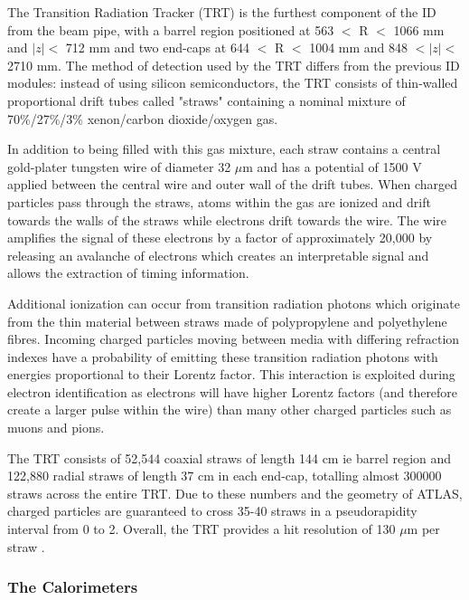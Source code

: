 \documentclass[12pt,a4paper,epsf,portrait,times,epsfig]{article}
\begin{document}
		The Transition Radiation Tracker (TRT) \cite{ATLASTRT} is the furthest component of the ID from the beam pipe, with a barrel region positioned at 563 $<$ R $<$ 1066 mm and $|z| <$ 712 mm and two end-caps at 644 $<$ R $<$ 1004 mm and 848 $< |z| <$ 2710 mm. The method of detection used by the TRT differs from the previous ID modules: instead of using silicon semiconductors, the TRT consists of thin-walled proportional drift tubes called "straws" containing a nominal mixture of 70\%/27\%/3\% xenon/carbon dioxide/oxygen gas. \par 
		In addition to being filled with this gas mixture, each straw contains a central gold-plater tungsten wire of diameter 32 $\mu$m and has a potential of 1500 V applied between the central wire and outer wall of the drift tubes. When charged particles pass through the straws, atoms within the gas are ionized and drift towards the walls of the straws while electrons drift towards the wire. The wire amplifies the signal of these electrons by a factor of approximately 20,000 by releasing an avalanche of electrons which creates an interpretable signal and allows the extraction of timing information. \par
		Additional ionization can occur from transition radiation photons which originate from the thin material between straws made of polypropylene and polyethylene fibres. Incoming charged particles moving between media with differing refraction indexes have a probability of emitting these transition radiation photons with energies proportional to their Lorentz factor. This interaction is exploited during electron identification as electrons will have higher Lorentz factors (and therefore create a larger pulse within the wire) than many other charged particles such as muons and pions. \par
		The TRT consists of 52,544 coaxial straws of length 144 cm ie barrel region and 122,880 radial straws of length 37 cm in each end-cap, totalling almost 300000 straws across the entire TRT. Due to these numbers and the geometry of ATLAS, charged particles are guaranteed to cross 35-40 straws in a pseudorapidity interval from 0 to 2. Overall, the TRT provides a hit resolution of 130 $\mu$m per straw \cite{ATLASTRTRes}. 

		\subsubsection{The Calorimeters}

\end{document}
